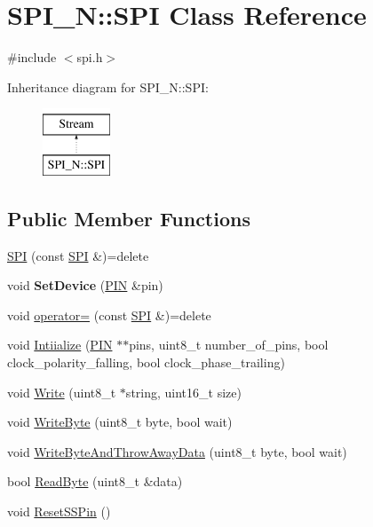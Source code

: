 \hypertarget{class_s_p_i___n_1_1_s_p_i}{\section{S\-P\-I\-\_\-\-N\-:\-:S\-P\-I Class Reference}
\label{class_s_p_i___n_1_1_s_p_i}
}


{\ttfamily \#include $<$spi.\-h$>$}

Inheritance diagram for S\-P\-I\-\_\-\-N\-:\-:S\-P\-I\-:\begin{figure}[H]
\begin{center}
\leavevmode
\includegraphics[height=2.000000cm]{class_s_p_i___n_1_1_s_p_i}
\end{center}
\end{figure}
\subsection*{Public Member Functions}
\begin{DoxyCompactItemize}
\item 
\hyperlink{class_s_p_i___n_1_1_s_p_i_ab486ba0f0d9ec880520e568762cc6c7d}{S\-P\-I} (const \hyperlink{class_s_p_i___n_1_1_s_p_i}{S\-P\-I} \&)=delete
\item 
\hypertarget{class_s_p_i___n_1_1_s_p_i_ad04a79c8e9139545a96af71245ce8d18}{void {\bfseries Set\-Device} (\hyperlink{struct_s_p_i___n_1_1_p_i_n}{P\-I\-N} \&pin)}\label{class_s_p_i___n_1_1_s_p_i_ad04a79c8e9139545a96af71245ce8d18}

\item 
void \hyperlink{class_s_p_i___n_1_1_s_p_i_aabc66612d396c2b70e5cbdba405dbfe5}{operator=} (const \hyperlink{class_s_p_i___n_1_1_s_p_i}{S\-P\-I} \&)=delete
\item 
void \hyperlink{class_s_p_i___n_1_1_s_p_i_a716a42a09541bb28a90a501ff54a459a}{Intiialize} (\hyperlink{struct_s_p_i___n_1_1_p_i_n}{P\-I\-N} $\ast$$\ast$pins, uint8\-\_\-t number\-\_\-of\-\_\-pins, bool clock\-\_\-polarity\-\_\-falling, bool clock\-\_\-phase\-\_\-trailing)
\item 
void \hyperlink{class_s_p_i___n_1_1_s_p_i_a3e2e2a7f02ffa5003548a1b9d820ce9a}{Write} (uint8\-\_\-t $\ast$string, uint16\-\_\-t size)
\item 
void \hyperlink{class_s_p_i___n_1_1_s_p_i_a542dc8e88203de7040ce9926d06b9463}{Write\-Byte} (uint8\-\_\-t byte, bool wait)
\item 
void \hyperlink{class_s_p_i___n_1_1_s_p_i_a05bcca2e033422b2e6ad570320d03fcb}{Write\-Byte\-And\-Throw\-Away\-Data} (uint8\-\_\-t byte, bool wait)
\item 
bool \hyperlink{class_s_p_i___n_1_1_s_p_i_a57ee9af74ec6a2d37001674f37f46344}{Read\-Byte} (uint8\-\_\-t \&data)
\item 
void \hyperlink{class_s_p_i___n_1_1_s_p_i_a6daa4720c8710e177f71ac318b96a3f8}{Reset\-S\-S\-Pin} ()
\end{DoxyCompactItemize}
